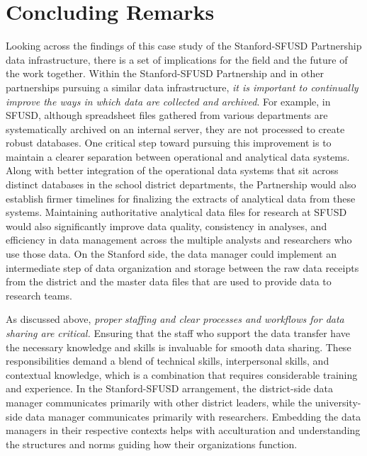 \documentclass[
]{book}
\begin{document}
\hypertarget{concluding-remarks-1}{%
\section{Concluding Remarks}\label{concluding-remarks-1}}

Looking across the findings of this case study of the Stanford-SFUSD Partnership data infrastructure, there is a set of implications for the field and the future of the work together. Within the Stanford-SFUSD Partnership and in other partnerships pursuing a similar data infrastructure, \emph{it is important to continually improve the ways in which data are collected and archived}. For example, in SFUSD, although spreadsheet files gathered from various departments are systematically archived on an internal server, they are not processed to create robust databases. One critical step toward pursuing this improvement is to maintain a clearer separation between operational and analytical data systems. Along with better integration of the operational data systems that sit across distinct databases in the school district departments, the Partnership would also establish firmer timelines for finalizing the extracts of analytical data from these systems. Maintaining authoritative analytical data files for research at SFUSD would also significantly improve data quality, consistency in analyses, and efficiency in data management across the multiple analysts and researchers who use those data. On the Stanford side, the data manager could implement an intermediate step of data organization and storage between the raw data receipts from the district and the master data files that are used to provide data to research teams.

As discussed above, \emph{proper} \emph{staffing and clear processes and workflows for data sharing are critical.} Ensuring that the staff who support the data transfer have the necessary knowledge and skills is invaluable for smooth data sharing. These responsibilities demand a blend of technical skills, interpersonal skills, and contextual knowledge, which is a combination that requires considerable training and experience. In the Stanford-SFUSD arrangement, the district-side data manager communicates primarily with other district leaders, while the university-side data manager communicates primarily with researchers. Embedding the data managers in their respective contexts helps with acculturation and understanding the structures and norms guiding how their organizations function.
\end{document}
